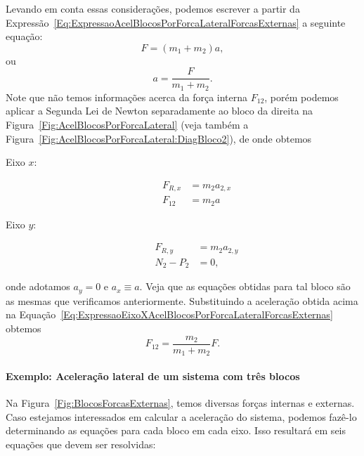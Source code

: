 Levando em conta essas considerações, podemos escrever a partir da Expressão~\eqref{Eq:ExpressaoAcelBlocosPorForcaLateralForcasExternas} a seguinte equação:
\begin{equation}
    F = (m_1 + m_2) a,
\end{equation}
%
ou
\begin{equation}
    a = \frac{F}{m_1 + m_2}.
\end{equation}
%
Note que não temos informações acerca da força interna $F_{12}$, porém podemos aplicar a Segunda Lei de Newton separadamente ao bloco da direita na Figura~\ref{Fig:AcelBlocosPorForcaLateral} (veja também a Figura~\ref{Fig:AcelBlocosPorForcaLateral:DiagBloco2}),
de onde obtemos
\begin{description}
    \item[Eixo $x$:] 
        \begin{align}
            F_{R, x} &= m_2 a_{2,x} \\
            F_{12} &= m_2 a \label{Eq:ExpressaoEixoXAcelBlocosPorForcaLateralForcasExternas}
        \end{align}
    \item[Eixo $y$:]
        \begin{align}
            F_{R, y} &= m_2 a_{2,y} \\
            N_2 - P_2 &= 0,
        \end{align}
\end{description}
%
onde adotamos $a_y = 0$ e $a_x \equiv a$. Veja que as equações obtidas para tal bloco são as mesmas que verificamos anteriormente. Substituindo a aceleração obtida acima na Equação~\eqref{Eq:ExpressaoEixoXAcelBlocosPorForcaLateralForcasExternas} obtemos
\begin{equation}
    F_{12} = \frac{m_2}{m_1 + m_2} F.
\end{equation}

\paragraph{Exemplo: Aceleração lateral de um sistema com três blocos}

Na Figura~\ref{Fig:BlocosForcasExternas}, temos diversas forças internas e externas. Caso estejamos interessados em calcular a aceleração do sistema, podemos fazê-lo determinando as equações para cada bloco em cada eixo. Isso resultará em seis equações que devem ser resolvidas:

